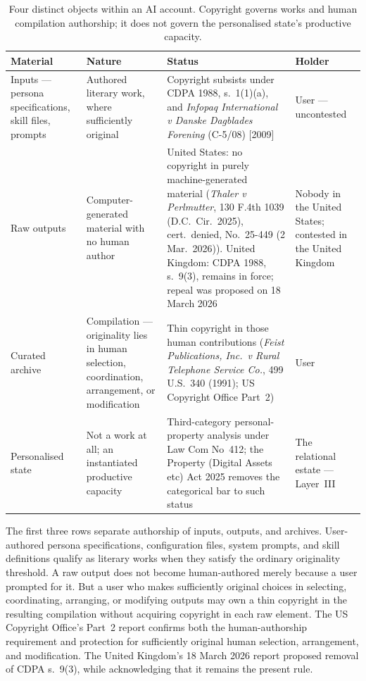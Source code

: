 \begin{table}[htbp]
\centering
\footnotesize
\setlength{\tabcolsep}{4pt}
\begin{tabular}{@{}>{\raggedright\arraybackslash}p{3.0cm}>{\raggedright\arraybackslash}p{3.0cm}>{\raggedright\arraybackslash}p{5.4cm}>{\raggedright\arraybackslash}p{2.3cm}@{}}
\toprule
\textbf{Material} & \textbf{Nature} & \textbf{Status} & \textbf{Holder} \\
\midrule
Inputs --- persona specifications, skill files, prompts & Authored literary work, where sufficiently original & Copyright subsists under CDPA 1988, s.~1(1)(a), and \emph{Infopaq International v Danske Dagblades Forening} (C-5/08) [2009] & User --- uncontested \\
\addlinespace
Raw outputs & Computer-generated material with no human author & United States: no copyright in purely machine-generated material (\emph{Thaler v Perlmutter}, 130 F.4th 1039 (D.C.\ Cir.\ 2025), cert.\ denied, No.\ 25-449 (2 Mar.\ 2026)). United Kingdom: CDPA 1988, s.~9(3), remains in force; repeal was proposed on 18 March 2026 & Nobody in the United States; contested in the United Kingdom \\
\addlinespace
Curated archive & Compilation --- originality lies in human selection, coordination, arrangement, or modification & Thin copyright in those human contributions (\emph{Feist Publications, Inc.\ v Rural Telephone Service Co.}, 499 U.S.\ 340 (1991); US Copyright Office Part~2) & User \\
\addlinespace
Personalised state & Not a work at all; an instantiated productive capacity & Third-category personal-property analysis under Law Com No~412; the Property (Digital Assets etc) Act 2025 removes the categorical bar to such status & The relational estate --- Layer~III \\
\bottomrule
\end{tabular}
\caption{Four distinct objects within an AI account. Copyright governs works and human compilation authorship; it does not govern the personalised state's productive capacity.}
\label{tab:four-way-split}
\end{table}

The first three rows separate authorship of inputs, outputs, and archives. User-authored persona specifications, configuration files, system prompts, and skill definitions qualify as literary works when they satisfy the ordinary originality threshold. A raw output does not become human-authored merely because a user prompted for it. But a user who makes sufficiently original choices in selecting, coordinating, arranging, or modifying outputs may own a thin copyright in the resulting compilation without acquiring copyright in each raw element. The US Copyright Office's Part~2 report confirms both the human-authorship requirement and protection for sufficiently original human selection, arrangement, and modification.\cite{usco2025aipart2} The United Kingdom's 18 March 2026 report proposed removal of CDPA s.~9(3), while acknowledging that it remains the present rule.\cite{ukgov2026copyrightai}

